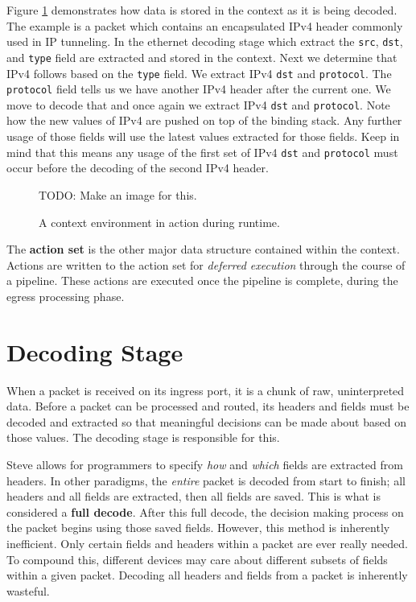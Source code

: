 Figure \ref{fg:ContextEnvWorking} demonstrates how data is stored in the context as it is being decoded. The example is a packet which contains an encapsulated IPv4 header commonly used in IP tunneling. In the ethernet decoding stage which extract the \texttt{src}, \texttt{dst}, and \texttt{type} field are extracted and stored in the context. Next we determine that IPv4 follows based on the \texttt{type} field. We extract IPv4 \texttt{dst} and \texttt{protocol}. The \texttt{protocol} field tells us we have another IPv4 header after the current one. We move to decode that and once again we extract IPv4 \texttt{dst} and \texttt{protocol}. Note how the new values of IPv4 are pushed on top of the binding stack. Any further usage of those fields will use the latest values extracted for those fields. Keep in mind that this means any usage of the first set of IPv4 \texttt{dst} and \texttt{protocol} must occur before the decoding of the second IPv4 header.\

\begin{figure}
TODO: Make an image for this.
\caption{A context environment in action during runtime.}
\label{fg:ContextEnvWorking}
\end{figure}

The \textbf{action set} is the other major data structure contained within the context. Actions are written to the action set for \textit{deferred execution} through the course of a pipeline. These actions are executed once the pipeline is complete, during the egress processing phase.

\section{Decoding Stage} \label{decoder_desc}

When a packet is received on its ingress port, it is a chunk of raw, uninterpreted data. Before a packet can be processed and routed, its headers and fields must be decoded and extracted so that meaningful decisions can be made about based on those values. The decoding stage is responsible for this.

Steve allows for programmers to specify \textit{how} and \textit{which} fields are extracted from headers. In other paradigms, the \textit{entire} packet is decoded from start to finish; all headers and all fields are extracted, then all fields are saved. This is what is considered a \textbf{full decode}. After this full decode, the decision making process on the packet begins using those saved fields. However, this method is inherently inefficient. Only certain fields and headers within a packet are ever really needed. To compound this, different devices may care about different subsets of fields within a given packet. Decoding all headers and fields from a packet is inherently wasteful.

